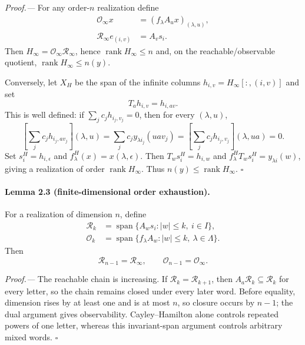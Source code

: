 \documentclass[aps,prl,onecolumn,superscriptaddress,nofootinbib]{revtex4-2}
\newcommand{\rank}{\operatorname{rank}}
\newcommand{\cR}{\mathcal R}
\newcommand{\cO}{\mathcal O}
\begin{document}
\emph{Proof.---}
For any order-$n$ realization define
\begin{align}
 \cO_\infty x&=(f_\lambda A_ux)_{(\lambda,u)},\nonumber\\
 \cR_\infty e_{(i,v)}&=A_vs_i.
\end{align}
Then $H_\infty=\cO_\infty\cR_\infty$, hence $\rank H_\infty\le n$ and, on the reachable/observable quotient, $\rank H_\infty\le n(y)$.

Conversely, let $X_H$ be the span of the infinite columns $h_{i,v}=H_\infty[:,(i,v)]$ and set
\begin{equation}
 T_ah_{i,v}=h_{i,av}.
 \label{eq:canonical-shift}
\end{equation}
This is well defined: if $\sum_jc_jh_{i_j,v_j}=0$, then for every $(\lambda,u)$,
\begin{equation}
 \left[\sum_jc_jh_{i_j,av_j}\right](\lambda,u)
 =\sum_jc_jy_{\lambda i_j}(uav_j)
 =\left[\sum_jc_jh_{i_j,v_j}\right](\lambda,ua)=0.
\end{equation}
Set $s_i^H=h_{i,\epsilon}$ and $f_\lambda^H(x)=x(\lambda,\epsilon)$.  Then $T_ws_i^H=h_{i,w}$ and $f_\lambda^HT_ws_i^H=y_{\lambda i}(w)$, giving a realization of order $\rank H_\infty$.  Thus $n(y)\le\rank H_\infty$. \hfill$\square$

\paragraph{Lemma 2.3 (finite-dimensional order exhaustion).}
For a realization of dimension $n$, define
\begin{align}
 \cR_k&=\operatorname{span}\{A_ws_i:|w|\le k,\ i\in I\},\nonumber\\
 \cO_k&=\operatorname{span}\{f_\lambda A_w:|w|\le k,\ \lambda\in\Lambda\}.
 \label{eq:ROchains}
\end{align}
Then
\begin{equation}
 \cR_{n-1}=\cR_\infty,
 \qquad \cO_{n-1}=\cO_\infty.
 \label{eq:order-exhaustion}
\end{equation}

\emph{Proof.---}
The reachable chain is increasing.  If $\cR_k=\cR_{k+1}$, then $A_a\cR_k\subseteq\cR_k$ for every letter, so the chain remains closed under every later word.  Before equality, dimension rises by at least one and is at most $n$, so closure occurs by $n-1$; the dual argument gives observability.  Cayley--Hamilton alone controls repeated powers of one letter, whereas this invariant-span argument controls arbitrary mixed words. \hfill$\square$
\end{document}
